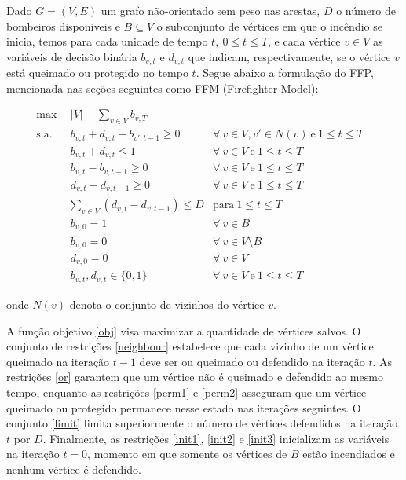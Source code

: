 \documentclass{MO824}
\begin{document}
    Dado $G=(V,E)$ um grafo não-orientado sem peso nas arestas, $D$ o número de bombeiros disponíveis e $B \subseteq V$ o subconjunto de vértices em que o incêndio se inicia, temos para cada unidade de tempo $t,~0 \leq t \leq T$, e cada vértice $v \in V$ as variáveis de decisão binária $b_{v,t}$ e $d_{v,t}$ que indicam, respectivamente, se o vértice $v$ está queimado ou protegido no tempo $t$. Segue abaixo a formulação do FFP, mencionada nas seções seguintes como FFM (Firefighter Model):
    \vspace{-16pt} 
    \begin{center}
    \begin{align}
    \max & \ \ |V| -  \sum_{v \in V} b_{v,T} & \label{obj} \\
    \mbox{s.a.}
        & \ \ b_{v,t} + d_{v,t} - b_{v',t-1} \geq 0 & \forall \ v \in V, v' \in N(v) \ \text{e} \ 1 \leq t \leq T & \label{neighbour} \\
        & \ \ b_{v,t} + d_{v,t} \leq 1 & \forall \ v \in V \ \text{e} \ 1 \leq t \leq T & \label{or} \\
        & \ \ b_{v,t} - b_{v,t-1} \geq 0 & \forall \ v \in V \ \text{e} \ 1 \leq t \leq T & \label{perm1} \\
        & \ \ d_{v,t} - d_{v,t-1} \geq 0 & \forall \ v \in V \ \text{e} \ 1 \leq t \leq T & \label{perm2} \\
        & \ \sum_{v \in V}(d_{v,t} - d_{v,t-1}) \leq D & \text{para} \ 1 \leq t \leq T & \label{limit} \\
        & \ \ b_{v,0} = 1 & \forall \ v \in B & \label{init1} \\
        & \ \ b_{v,0} = 0 & \forall \ v \in V \setminus B & \label{init2} \\
        & \ \ d_{v,0} = 0 & \forall \ v \in V & \label{init3} \\
        & \ \ b_{v,t}, d_{v,t} \in \{0, 1\} & \forall \ v \in V \ \text{e} \ 1 \leq t \leq T & \label{bin}
    \end{align}
    \end{center}

    onde $N(v)$ denota o conjunto de vizinhos do vértice $v$. 
    
    A função objetivo \eqref{obj} visa maximizar a quantidade de vértices salvos. O conjunto de restrições \eqref{neighbour} estabelece que cada vizinho de um vértice queimado na iteração $t - 1$ deve ser ou queimado ou defendido na iteração $t$. As restrições \eqref{or} garantem que um vértice não é queimado e defendido ao mesmo tempo, enquanto as restrições \eqref{perm1} e \eqref{perm2} asseguram que um vértice queimado ou protegido permanece nesse estado nas iterações seguintes. O conjunto \eqref{limit} limita superiormente o número de vértices defendidos na iteração $t$ por $D$. Finalmente, as restrições \eqref{init1}, \eqref{init2} e \eqref{init3} inicializam as variáveis na iteração $t=0$, momento em que somente os vértices de $B$ estão incendiados e nenhum vértice é defendido. 
    
\end{document}
